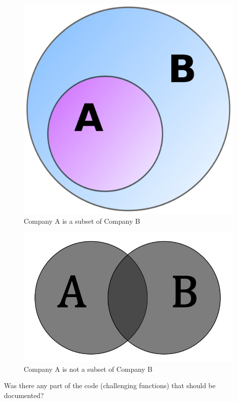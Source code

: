 \documentclass[oneside]{article}
\begin{document}
\begin{figure}[h!]
\centering
\includegraphics[scale=0.05]{img/venn_a_subset_b.png}
\caption{Company A is a subset of Company B}
\label{fig:venn_a_subset_b}
\end{figure}

\begin{figure}[h!]
\centering
\includegraphics[scale=0.1]{img/venn_a_and_b.jpg}
\caption{Company A is not a subset of Company B}
\label{fig:venn_a_and_b}
\end{figure}

Was there any part of the code (challenging functions) that should be
documented?
\end{document}
